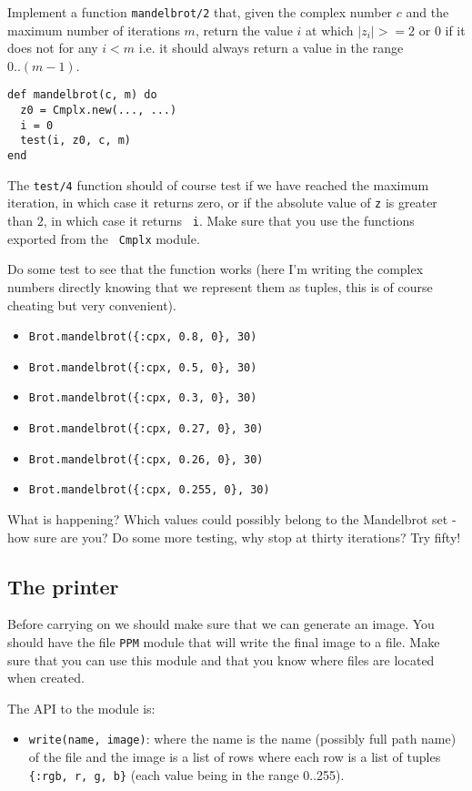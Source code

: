 \documentclass[a4paper,11pt]{article}
\begin{document}
Implement a function {\tt mandelbrot/2} that, given the complex number
$c$ and the maximum number of iterations $m$, return the value $i$ at
which $|z_i| >= 2$ or $0$ if it does not for any $i < m$ i.e. it
should always return a value in the range $0..(m-1)$.

\begin{verbatim}
def mandelbrot(c, m) do
  z0 = Cmplx.new(..., ...)
  i = 0
  test(i, z0, c, m)
end
\end{verbatim}

The {\tt test/4} function should of course test if we have reached the
maximum iteration, in which case it returns zero, or if the absolute
value of {\tt z} is greater than $2$, in which case it returns {\tt
  i}. Make sure that you use the functions exported from the {\tt
  Cmplx} module.

Do some test to see that the function works (here I'm writing the
complex numbers directly knowing that we represent them as tuples,
this is of course cheating but very convenient).

\begin{itemize}
 \item {\tt Brot.mandelbrot(\{:cpx, 0.8, 0\}, 30)}
 \item {\tt Brot.mandelbrot(\{:cpx, 0.5, 0\}, 30)}
 \item {\tt Brot.mandelbrot(\{:cpx, 0.3, 0\}, 30)}
 \item {\tt Brot.mandelbrot(\{:cpx, 0.27, 0\}, 30)} 
 \item {\tt Brot.mandelbrot(\{:cpx, 0.26, 0\}, 30)}
 \item {\tt Brot.mandelbrot(\{:cpx, 0.255, 0\}, 30)}
\end{itemize}

What is happening? Which values could possibly belong to the
Mandelbrot set - how sure are you? Do some more testing, why stop at
thirty iterations? Try fifty!


\subsection{The printer}

Before carrying on we should make sure that we can generate an
image. You should have the file {\tt PPM} module that will write the
final image to a file. Make sure that you can use this module and that
you know where files are located when created.

The API to the module is:

\begin{itemize}
 \item {\tt write(name, image)}: where the name is the name (possibly
   full path name) of the file and the image is a list of rows where
   each row is a list of tuples {\tt \{:rgb, r, g, b\}} (each value being in
   the range 0..255).
\end{itemize}
\end{document}
